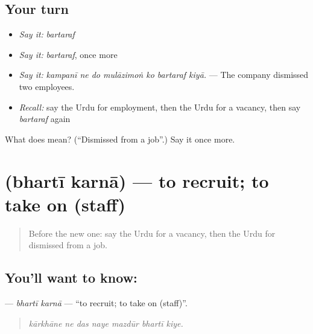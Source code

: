 \subsection*{Your turn}
\begin{itemize}
\raggedright
  \item \emph{Say it:} \emph{bartaraf}
  \item \emph{Say it:} \emph{bartaraf}, once more
  \item \emph{Say it:} \emph{kampanī ne do mulāzimoṅ ko bartaraf kiyā.} — The company dismissed two employees.
  \item \emph{Recall:} say the Urdu for employment, then the Urdu for a vacancy, then say \emph{bartaraf} again
\end{itemize}

\begin{tcolorbox}[breakable,colback=teal!4,colframe=teal!35!black,title={Before you move on}]
What does  mean? (\textquotedblleft{}Dismissed from a job\textquotedblright{}.) Say it once more.
\end{tcolorbox}
\section[\texorpdfstring{\ur{بھرتی} \ur{کرنا} (bhartī karnā)}{بھرتی کرنا (bhartī karnā)}]{  (bhartī karnā) — to recruit; to take on (staff)}

\label{lesson:UR-C494-bharti-karna}



\begin{quote}
Before the new one: say the Urdu for a vacancy, then the Urdu for dismissed from a job.
\end{quote}

\subsection*{You'll want to know:  }
\textbf{ } — \emph{bhartī karnā} — \textquotedblleft{}to recruit; to take on (staff)\textquotedblright{}.

\begin{quote}
      
\end{quote}

\begin{quote}
\emph{kārkhāne ne das naye mazdūr bhartī kiye.}
\end{quote}

